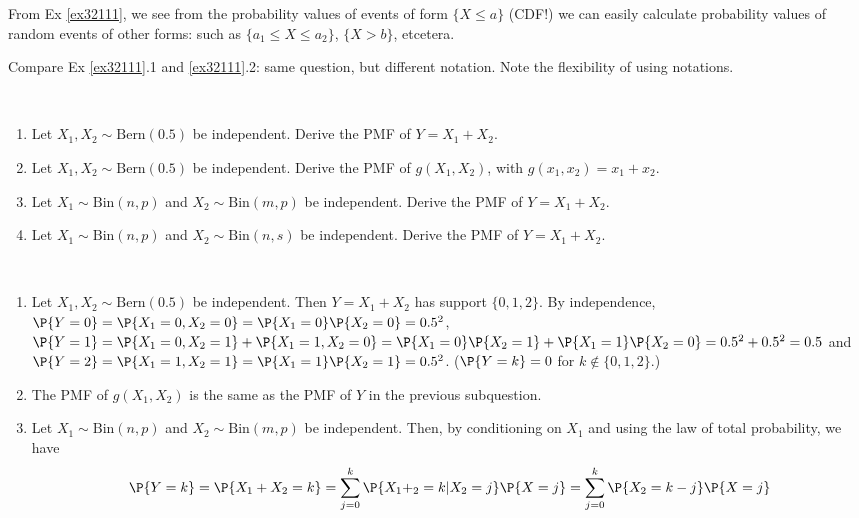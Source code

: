 \begin{remark}
	From Ex \ref{ex32111}, we see from the probability values of events of form $\{X\leq a\}$ (CDF!) we can easily calculate probability values of random events of other forms: such as   $\{a_1\leq X\leq a_2\}$, $\{X>b\}$, etcetera.
\end{remark}

\begin{remark}
	Compare Ex \ref{ex32111}.1 and  \ref{ex32111}.2: same question, but different notation. Note the flexibility of using notations.
\end{remark}

\begin{exercise}~\label{ex3211}
	\begin{enumerate}
 		\item Let $X_1,X_2\sim \text{Bern}(0.5)$ be independent. Derive the PMF of $Y=X_1+X_2$. 
 		\item Let $X_1,X_2\sim \text{Bern}(0.5)$ be independent. Derive the PMF of $g(X_1,X_2)$, with $g(x_1,x_2)=x_1+x_2$.	 
 		\item Let $X_1\sim \text{Bin}(n, p)$ and $X_2\sim \text{Bin}(m, p)$ be independent. Derive the PMF of $Y=X_1+X_2$.
 		\item Let $X_1\sim \text{Bin}(n,p)$ and $X_2\sim \text{Bin}(n,s)$ be independent. Derive the PMF of $Y=X_1+X_2$.
 	\end{enumerate}
 	\begin{solution}~
 		\begin{enumerate}
 			\item Let $X_1,X_2\sim \text{Bern}(0.5)$ be independent. Then $Y = X_1 + X_2$ has support $\{0,1,2\}$. By independence, $\P{Y = 0} = \P{X_1 = 0, X_2 = 0} = \P{X_1 = 0} \P{X_2 = 0} = 0.5^2$, $\P{Y = 1} = \P{X_1 = 0, X_2 = 1} + \P{X_1 = 1, X_2 = 0} = \P{X_1 = 0} \P{X_2 = 1} + \P{X_1 = 1} \P{X_2 = 0}= 0.5^2 + 0.5^2 = 0.5$ and $\P{Y = 2} = \P{X_1 = 1, X_2 = 1} = \P{X_1 = 1} \P{X_2 = 1} = 0.5^2$. ($\P{Y = k} = 0$ for $k \notin \{0, 1, 2\}$.)
 			\item The PMF of $g(X_1,X_2)$ is the same as the PMF of $Y$ in the previous subquestion.
 			\item Let $X_1 \sim \text{Bin}(n, p)$ and $X_2 \sim \text{Bin}(m, p)$ be independent. Then, by conditioning on $X_1$ and using the law of total probability, we have
				 \begin{align*}
					 \P{Y = k} & = \P{X_1 + X_2 = k} = \sum_{j = 0}^k \P{X_1 + _2 = k|X_2=j} \P{X = j} = \sum_{j = 0}^k \P{X_2 = k - j} \P{X = j} \\

\end{align*}
\end{enumerate}
\end{solution}
\end{exercise}

